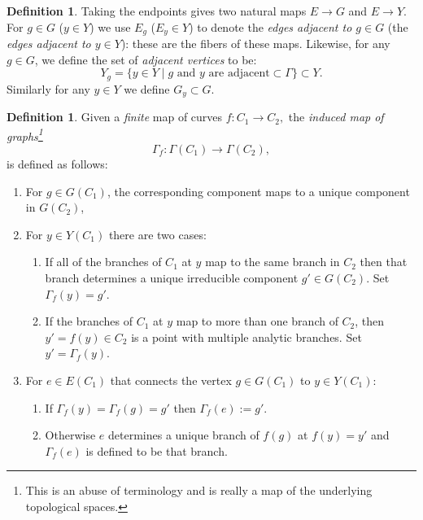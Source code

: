\documentclass[JEP,XML,SOM,Unicode,NoFloatCountersInSection,published]{cedram}
\theoremstyle{plain}
\theoremstyle{definition}
\newtheorem{definition}[theorem]{Definition}
\newcommand\cl{{\colon}}
\begin{document}
\begin{definition}
Taking the endpoints gives two natural maps $E\to G$ and $E\to Y$. For $g\in G$ (\resp $y\in Y$) we use $E_g$ (\resp $E_y\in Y$) to denote the \textit{edges adjacent to $g\in G$} (\resp the \textit{edges adjacent to $y\in Y$}): these are the fibers of these maps. Likewise, for any $g\in G$, we define the set of \textit{adjacent vertices} to be:\vspace*{-3pt}
\[
Y_g=\{ y\in Y \mid g\text{ and }y\text{ are adjacent} \subset \Gamma\} \subset Y.
\]
Similarly for any $y\in Y$ we define $G_y\subset G$.
\end{definition}

\begin{definition}
Given a \emph{finite} map of curves $f\cl C_1\to C_2,$ the \textit{induced map of graphs\footnote{This is an abuse of terminology and is really a map of the underlying topological spaces.}}\vspace*{-3pt}
\[
\Gamma_f\cl \Gamma(C_1)\to \Gamma(C_2),
\]
is defined as follows:

\begin{enumerate}
\item For $g\in G(C_1)$, the corresponding component maps to a unique component in $G(C_2)$,
\item For $y\in Y(C_1)$ there are two cases:
\begin{enumerate}
\item If all of the branches of $C_1$ at $y$ map to the same branch in $C_2$ then that branch determines a unique irreducible component $g'\in G(C_2)$. Set $\Gamma_f(y) = g'$.
\item If the branches of $C_1$ at $y$ map to more than one branch of $C_2$, then $y'=f(y)\in C_2$ is a point with multiple analytic branches. Set $y'=\Gamma_f(y)$.
\end{enumerate}
\item For $e\in E(C_1)$ that connects the vertex $g\in G(C_1)$ to $y\in Y(C_1)$:
\begin{enumerate}
\item If $\Gamma_f(y) = \Gamma_f(g)=g'$ then $\Gamma_f(e) := g'$.
\item Otherwise $e$ determines a unique branch of $f(g)$ at $f(y) = y'$ and $\Gamma_f(e)$ is defined to be that branch.
\end{enumerate}
\end{enumerate}
\end{definition}
\end{document}
